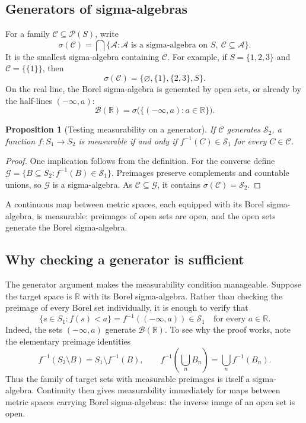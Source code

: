 \documentclass[10pt,a4paper]{article}
\newtheorem{proposition}{Proposition}
\newcommand{\R}{\mathbb R}\newcommand{\Q}{\mathbb Q}\newcommand{\E}{\mathbb E}\newcommand{\B}{\mathcal B}
\begin{document}
\subsection*{Generators of sigma-algebras}
For a family $\mathcal C\subseteq\mathcal P(S)$, write
\[
\sigma(\mathcal C)=\bigcap\{\mathcal A:\mathcal A\text{ is a sigma-algebra on }S,
\ \mathcal C\subseteq\mathcal A\}.
\]
It is the smallest sigma-algebra containing $\mathcal C$. For example, if $S=\{1,2,3\}$ and $\mathcal C=\{\{1\}\}$, then
\[
\sigma(\mathcal C)=\{\varnothing,\{1\},\{2,3\},S\}.
\]
On the real line, the Borel sigma-algebra is generated by open sets, or already by the half-lines $(-\infty,a)$:
\[
\B(\R)=\sigma\bigl(\{(-\infty,a):a\in\R\}\bigr).
\]
\begin{proposition}[Testing measurability on a generator]
If $\mathcal C$ generates $\mathcal S_2$, a function $f:S_1\to S_2$ is measurable if and only if $f^{-1}(C)\in\mathcal S_1$ for every $C\in\mathcal C$.
\end{proposition}
\begin{proof}
One implication follows from the definition. For the converse define
$\mathcal G=\{B\subseteq S_2:f^{-1}(B)\in\mathcal S_1\}$. Preimages preserve complements and countable unions, so $\mathcal G$ is a sigma-algebra. As $\mathcal C\subseteq\mathcal G$, it contains $\sigma(\mathcal C)=\mathcal S_2$.
\end{proof}
A continuous map between metric spaces, each equipped with its Borel sigma-algebra, is measurable: preimages of open sets are open, and the open sets generate the Borel sigma-algebra.


\subsection*{Why checking a generator is sufficient}
The generator argument makes the measurability condition manageable. Suppose the target space is $\R$ with its Borel sigma-algebra. Rather than checking the preimage of every Borel set individually, it is enough to verify that
\[
\{s\in S_1:f(s)<a\}=f^{-1}(( -\infty,a))\in\mathcal S_1
\quad\text{for every }a\in\R.
\]
Indeed, the sets $(-\infty,a)$ generate $\mathcal B(\R)$. To see why the proof works, note the elementary preimage identities
\[
f^{-1}(S_2\setminus B)=S_1\setminus f^{-1}(B),\qquad
f^{-1}\!\left(\bigcup_n B_n\right)=\bigcup_n f^{-1}(B_n).
\]
Thus the family of target sets with measurable preimages is itself a sigma-algebra. Continuity then gives measurability immediately for maps between metric spaces carrying Borel sigma-algebras: the inverse image of an open set is open.
\end{document}
